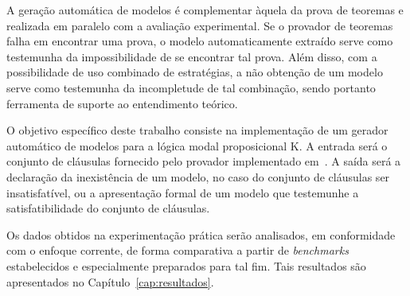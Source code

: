 A geração automática de modelos é complementar àquela da prova de teoremas e
realizada em paralelo com a avaliação experimental. Se o provador de teoremas
falha em encontrar uma prova, o modelo automaticamente extraído serve como
testemunha da impossibilidade de se encontrar tal prova. Além disso, com a
possibilidade de uso combinado de estratégias, a não obtenção de um modelo serve
como testemunha da incompletude de tal combinação, sendo portanto ferramenta de
suporte ao entendimento teórico.

O objetivo específico deste trabalho consiste na implementação de um gerador
automático de modelos para a lógica modal proposicional K. A entrada será o
conjunto de cláusulas fornecido pelo provador implementado
em~\cite{Nalon2016}. 
A saída será a declaração da inexistência de um modelo, no caso do conjunto de
cláusulas ser insatisfatível, ou a apresentação formal de um modelo que
testemunhe a satisfatibilidade do conjunto de cláusulas.

Os dados obtidos na experimentação prática serão analisados, em conformidade com
o enfoque corrente, de forma comparativa a partir de \textit{benchmarks}
estabelecidos e especialmente preparados para tal fim. Tais resultados são
apresentados no Capítulo~\ref{cap:resultados}.

